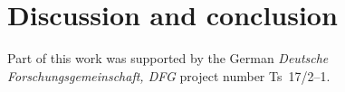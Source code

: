 \documentclass{aa}
\begin{document}
\section{Discussion and conclusion} \label{sec:discussion}

\begin{acknowledgements}
      Part of this work was supported by the German
      \emph{Deut\-sche For\-schungs\-ge\-mein\-schaft, DFG\/} project
      number Ts~17/2--1.
\end{acknowledgements}

%
%

\end{document}
